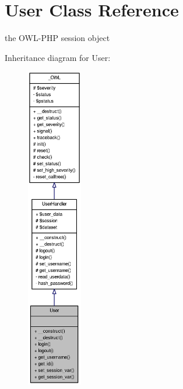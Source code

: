 \section{User Class Reference}
\label{classUser}


the OWL-\/PHP session object  




Inheritance diagram for User:\nopagebreak
\begin{figure}[H]
\begin{center}
\leavevmode
\includegraphics[height=400pt]{classUser__inherit__graph}
\end{center}
\end{figure}


